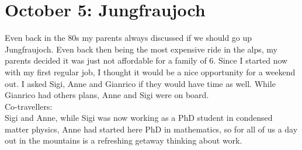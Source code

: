 \section{October 5: Jungfraujoch}
\label{2008:Jungfrau}

Even back in the 80s my parents always discussed if we should go up Jungfraujoch. Even back then being the most expensive ride in the alps, my parents decided it was just not affordable for a family of 6. Since I started now with my first regular job, I thought it would be a nice opportunity for a weekend out. I asked Sigi, Anne and Gianrico if they would have time as well. While Gianrico had others plans, Anne and Sigi were on board.\\

Co-travellers:\\
Sigi and Anne, while Sigi was now working as a PhD student in condensed matter physics, Anne had started here PhD in mathematics, so for all of us a day out in the mountains is a refreshing getaway thinking about work.\\

